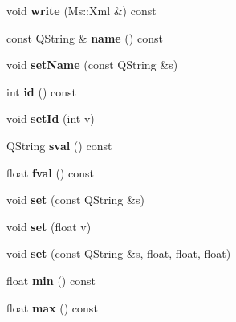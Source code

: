 \begin{DoxyCompactItemize}
void {\bfseries write} (Ms\+::\+Xml \&) const
\item 
\mbox{\label{class_synti_parameter_a6da8ec23193c2d97e99d500f51e421e6}} 
const Q\+String \& {\bfseries name} () const
\item 
\mbox{\label{class_synti_parameter_a2e571eeaca7e0201eefac3f190c44c5d}} 
void {\bfseries set\+Name} (const Q\+String \&s)
\item 
\mbox{\label{class_synti_parameter_aca4db9bf8f9dead4a0000458d4ef0a68}} 
int {\bfseries id} () const
\item 
\mbox{\label{class_synti_parameter_acf1d72b0834375ab721c518d9649b0e2}} 
void {\bfseries set\+Id} (int v)
\item 
\mbox{\label{class_synti_parameter_aa41fe9ba2ee491541945b4e063e35022}} 
Q\+String {\bfseries sval} () const
\item 
\mbox{\label{class_synti_parameter_a7b8d7a591fc57b2c37f77e9886e0b408}} 
float {\bfseries fval} () const
\item 
\mbox{\label{class_synti_parameter_a9ed489706deab9479e8c681a403d938c}} 
void {\bfseries set} (const Q\+String \&s)
\item 
\mbox{\label{class_synti_parameter_aece7859db79b037d76dec465e18375f7}} 
void {\bfseries set} (float v)
\item 
\mbox{\label{class_synti_parameter_a80cfa4a64c067217a8d44559308bda2d}} 
void {\bfseries set} (const Q\+String \&s, float, float, float)
\item 
\mbox{\label{class_synti_parameter_a177bacbf02a41c67936610ba5e524efa}} 
float {\bfseries min} () const
\item 
\mbox{\label{class_synti_parameter_a63e9724afb2f84881ade937e7d6b0374}} 
float {\bfseries max} () const
\item 
\mbox{\label{class_synti_parameter_a2aa59eb941eea5cec7f3c7c371cebd86}} 

\end{DoxyCompactItemize}
